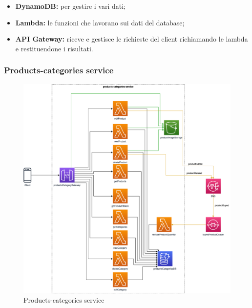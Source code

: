 \begin{itemize}
	\item \textbf{DynamoDB:} per gestire i vari dati;
	\item \textbf{Lambda:} le funzioni che lavorano sui dati del database;
	\item \textbf{API Gateway:} riceve e gestisce le richieste del client richiamando le lambda e restituendone i risultati.
\end{itemize}

\subsubsection{Products-categories service}
\begin{figure}[H]
	\centering
	\includegraphics[scale=0.4]{Immagini/Backend/AWSProductsCategories.png}
	\caption{Products-categories service}
	\label{fig:ProductCategories}
\end{figure}

